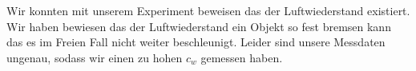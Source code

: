 Wir konnten mit unserem Experiment beweisen das der Luftwiederstand existiert. Wir haben bewiesen das der Luftwiederstand ein Objekt so fest bremsen kann das es im Freien Fall nicht weiter beschleunigt. Leider sind unsere Messdaten ungenau, sodass wir einen zu hohen $c_w$ gemessen haben. 